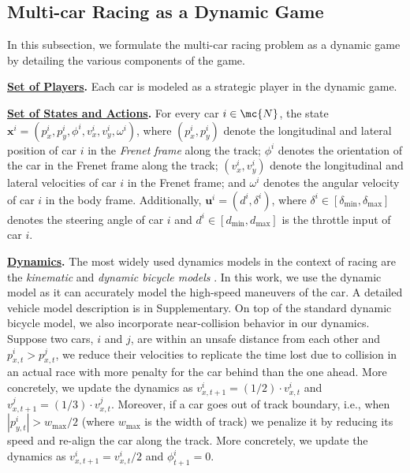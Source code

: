 \subsection{Multi-car Racing as a Dynamic Game}\label{ssec: RacingAsGame}
In this subsection, we formulate the multi-car racing problem as a dynamic game by detailing the various components of the game.

\vspace{0.1cm}
\noindent \textbf{\underline{Set of Players}.} Each car is modeled as a strategic player in the dynamic game.

\vspace{0.1cm}
\noindent \textbf{\underline{Set of States and Actions}.} For every car \(i \in \mc{N}\), the state \(\mathbf{x}^i=(p_x^i, p_y^i, \phi^i, v_x^i, v_y^i, \omega^i)\), where \((p_x^i, p_y^i)\) denote the longitudinal and lateral position of car \(i\) in the \textit{Frenet frame} along the track; \(\phi^i\) denotes the orientation of the car in the {Frenet frame} along the track; {\((v_x^i, v_y^i)\) denote the longitudinal and lateral velocities of car \(i\) in the {Frenet frame}}; and \(\omega^i\) denotes the angular velocity of car \(i\) in the body frame. Additionally, \(\mathbf{u}^i = (d^i, \delta^i)\), where \(\delta^i \in [\delta_{\min}, \delta_{\max}]\) denotes the steering angle of car \(i\) and \(d^i \in [d_{\min}, d_{\max}]\) is the throttle input of car \(i\). 

\vspace{1mm}
\noindent \textbf{\underline{Dynamics}.} The most widely used dynamics models in the context of racing are the \textit{kinematic} \citep{jia2023rapid, notomista2020enhancing, wang2019game, wang2021game} and \textit{dynamic bicycle models} \citep{Kalaria2023AdaptivePA, Brunke2020LearningMP}. In this work, we use the dynamic model as it can accurately model the high-speed maneuvers of the car. A detailed vehicle model description is in Supplementary. 
On top of the standard dynamic bicycle model, we also incorporate near-collision behavior in our dynamics. Suppose two cars, $i$ and $j$, are within an unsafe distance from each other and $p_{x,t}^{i} > p_{x,t}^{j}$, we reduce their velocities to replicate the time lost due to collision in an actual race with more penalty for the car behind than the one ahead. More concretely, we update the dynamics as $v_{x,t+1}^{i} = (1/2)\cdot v_{x,t}^{i}$ and $v_{x,t+1}^{j} = (1/3)\cdot v_{x,t}^{j}$. Moreover, if a car goes out of track boundary, i.e., when $|p_{y,t}^i|>{w_{\max}}/{2}$ (where \(w_{\max}\) is the width of track) we penalize it by reducing its speed and re-align the car along the track. More concretely, we update the dynamics as $v_{x,t+1}^i = v_{x,t}^i/2$ and $\phi_{t+1}^i=0$. 


